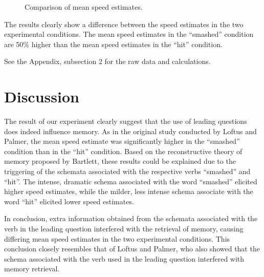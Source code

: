 \documentclass[a4paper,twocolumn]{report}
\begin{document}
\begin{figure}[h]
\begin{center}
\end{center}
\caption{Comparison of mean speed estimates.}
\end{figure}

The results clearly show a difference between the speed estimates in the
two experimental conditions. The mean speed estimates in the “smashed”
condition are 50\% higher than the mean speed estimates in the “hit”
condition.

See the Appendix, subsection 2 for the raw data and calculations.

\section{Discussion}

The result of our experiment clearly suggest that the use of leading
questions does indeed influence memory. As in the original study conducted
by Loftus and Palmer, the mean speed estimate was significantly higher in
the “smashed” condition than in the “hit” condition. Based on the
reconstructive theory of memory proposed by Bartlett, these results could
be explained due to the triggering of the schemata associated with the
respective verbs “smashed” and “hit”. The intense, dramatic schema
associated with the word “smashed” elicited higher speed estimates, while
the milder, less intense schema associate with the word “hit” elicited
lower speed estimates.

In conclusion, extra information obtained from the schemata associated with
the verb in the leading question interfered with the retrieval of memory,
causing differing mean speed estimates in the two experimental conditions.
This conclusion closely resembles that of Loftus and Palmer, who also
showed that the schema associated with the verb used in the leading question
interfered with memory retrieval.
\end{document}

